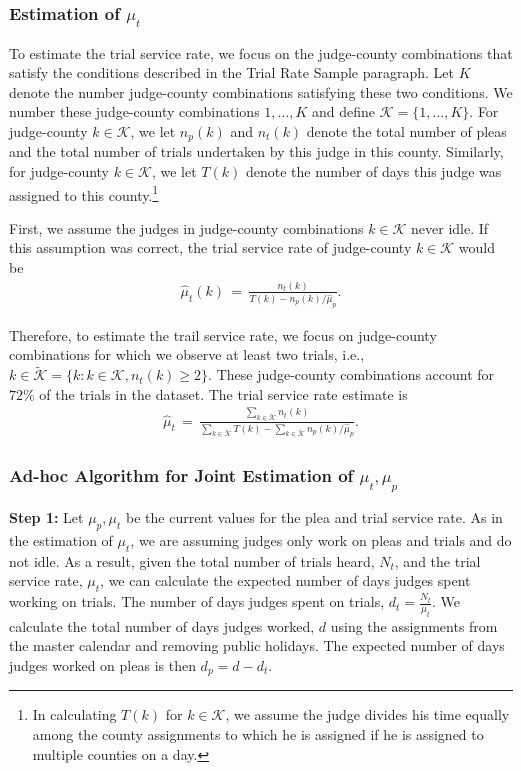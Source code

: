 \documentclass[11pt]{article}
\theoremstyle{ModifiedStyle}
\theoremstyle{ModifiedStyle}
\begin{document}
    \subsubsection{Estimation of $\mu_t$}
      \label{mu_t-estimation}
      To estimate the trial service rate, we focus on the judge-county combinations that satisfy the conditions described in the Trial Rate Sample paragraph. Let $K$ denote the number judge-county combinations satisfying these two conditions. We number these judge-county combinations $1,\ldots,K$ and define $\mathcal{K} = \{1,\ldots,K\}$. For judge-county $k \in \mathcal{K}$, we let $n_p(k)$ and $n_t(k)$ denote the total number of pleas and the total number of trials undertaken by this judge in this county. Similarly, for judge-county $k \in \mathcal{K}$, we let $T(k)$ denote the number of days this judge was assigned to this county.\footnote{In calculating $T(k)$ for $k\in\mathcal{K}$, we assume the judge divides his time equally among the county assignments to which he is assigned if he is assigned to multiple counties on a day.}

			First, we assume the judges in judge-county combinations $k\in\mathcal{K}$ never idle. If this assumption was correct, the trial service rate of judge-county $k\in\mathcal{K}$ would be
			\begin{align*}
				\hat{\mu}_t(k) \,=\, \frac{n_t(k)}{T(k) - n_p(k) / \hat{\mu}_p}.
			\end{align*}

      Therefore, to estimate the trail service rate, we focus on judge-county combinations for which we observe at least two trials, i.e., $k \in \tilde{\mathcal{K}} = \{k:k\in\mathcal{K},n_t(k)\geq 2\}$. These judge-county combinations account for $72\%$ of the trials in the dataset. The trial service rate estimate is
			\begin{align*}
				\hat{\mu}_t \,=\, \frac{ \sum\limits_{k\in\tilde{\mathcal{K}}} n_t(k) }{\sum\limits_{k\in\tilde{\mathcal{K}}} T(k) - \sum\limits_{k\in\tilde{\mathcal{K}}} n_p(k) / \hat{\mu}_p }.
			\end{align*}

    \subsubsection{Ad-hoc Algorithm for Joint Estimation of $\mu_t,\mu_p$}
      \textbf{Step 1:} Let $\mu_p,\mu_t$ be the current values for the plea and trial service rate. As in the estimation of $\mu_t$, we are assuming judges only work on pleas and trials and do not idle. As a result, given the total number of trials heard, $N_{t}$, and the trial service rate, $\mu_t$, we can calculate the expected number of days judges spent working on trials. The number of days judges spent on trials, $d_{t} = \frac{N_{t}}{\mu_t}$. We calculate the total number of days judges worked, $d$ using the assignments from the master calendar and removing public holidays. The expected number of days judges worked on pleas is then $d_{p} = d - d_{t}$. \\
\end{document}
